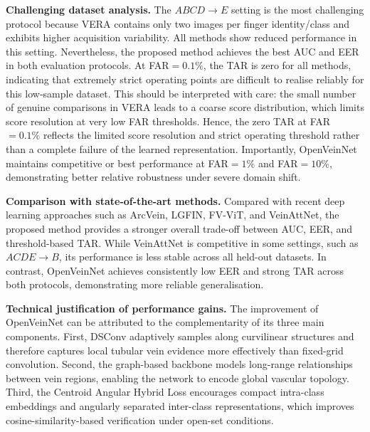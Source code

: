 \documentclass[10pt,journal,compsoc]{IEEEtran}
\begin{document}
\textbf{Challenging dataset analysis.}
The \(ABCD \rightarrow E\) setting is the most challenging protocol because VERA contains only two images per finger identity/class and exhibits higher acquisition variability. All methods show reduced performance in this setting. Nevertheless, the proposed method achieves the best AUC and EER in both evaluation protocols. At FAR$=0.1\%$, the TAR is zero for all methods, indicating that extremely strict operating points are difficult to realise reliably for this low-sample dataset. This should be interpreted with care: the small number of genuine comparisons in VERA leads to a coarse score distribution, which limits score resolution at very low FAR thresholds. Hence, the zero TAR at FAR$=0.1\%$ reflects the limited score resolution and strict operating threshold rather than a complete failure of the learned representation. Importantly, OpenVeinNet maintains competitive or best performance at FAR$=1\%$ and FAR$=10\%$, demonstrating better relative robustness under severe domain shift.


\textbf{Comparison with state-of-the-art methods.}
Compared with recent deep learning approaches such as ArcVein, LGFIN, FV-ViT, and VeinAttNet, the proposed method provides a stronger overall trade-off between AUC, EER, and threshold-based TAR. While VeinAttNet is competitive in some settings, such as \(ACDE \rightarrow B\), its performance is less stable across all held-out datasets. In contrast, OpenVeinNet achieves consistently low EER and strong TAR across both protocols, demonstrating more reliable generalisation.

\textbf{Technical justification of performance gains.}
The improvement of OpenVeinNet can be attributed to the complementarity of its three main components. First, DSConv adaptively samples along curvilinear structures and therefore captures local tubular vein evidence more effectively than fixed-grid convolution. Second, the graph-based backbone models long-range relationships between vein regions, enabling the network to encode global vascular topology. Third, the Centroid Angular Hybrid Loss encourages compact intra-class embeddings and angularly separated inter-class representations, which improves cosine-similarity-based verification under open-set conditions.
\end{document}
